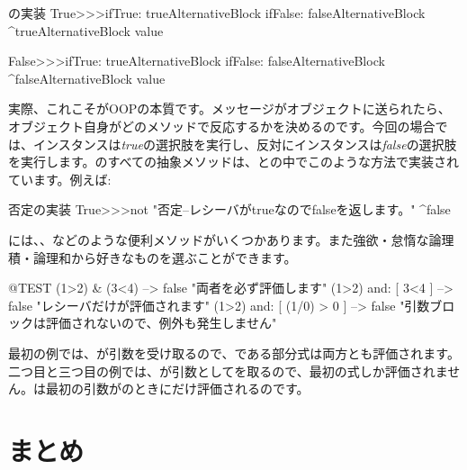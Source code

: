\documentclass[a4paper,10pt,twoside]{book}
\begin{document}
\begin{method}{の実装}
True>>>ifTrue: trueAlternativeBlock ifFalse: falseAlternativeBlock 
    ^trueAlternativeBlock value

False>>>ifTrue: trueAlternativeBlock ifFalse: falseAlternativeBlock 
    ^falseAlternativeBlock value
\end{method}

実際、これこそがOOPの本質です。メッセージがオブジェクトに送られたら、オブジェクト自身がどのメソッドで反応するかを決めるのです。今回の場合では、インスタンスは\emph{true}の選択肢を実行し、反対にインスタンスは\emph{false}の選択肢を実行します。のすべての抽象メソッドは、との中でこのような方法で実装されています。例えば:

\begin{method}{否定の実装}
True>>>not
    "否定--レシーバがtrueなのでfalseを返します。"
    ^false
\end{method}

には、、などのような便利メソッドがいくつかあります。また強欲・怠惰な論理積・論理和から好きなものを選ぶことができます。

\begin{code}{@TEST}
(1>2) & (3<4)              --> false    "両者を必ず評価します"
(1>2) and: [ 3<4 ]        --> false    "レシーバだけが評価されます"
(1>2) and: [ (1/0) > 0 ] --> false    "引数ブロックは評価されないので、例外も発生しません"
\end{code}

最初の例では、が引数を受け取るので、である部分式は両方とも評価されます。
二つ目と三つ目の例では、が引数としてを取るので、最初の式しか評価されません。は最初の引数がのときにだけ評価されるのです。


\section{まとめ}
\end{document}
